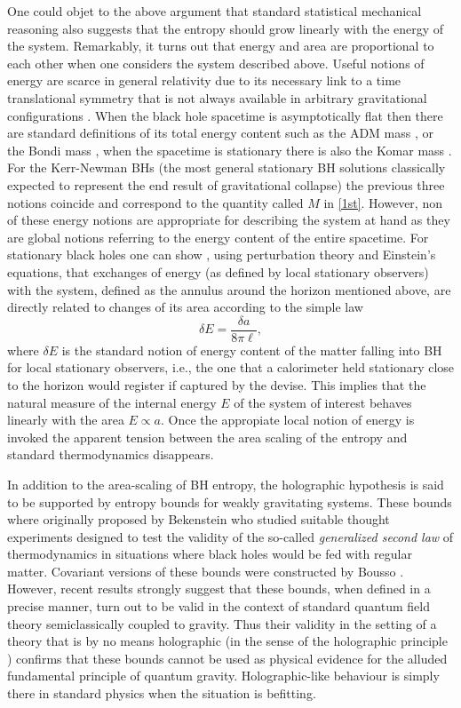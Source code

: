 \documentclass[aps, nofootinbib,superscriptaddress,12pt]{revtex4-2}
\def\be{\begin{equation}}
\def\ee{\end{equation}}
\begin{document}
One could objet to the above argument that standard statistical mechanical reasoning also suggests that the entropy should grow linearly with the energy of the system. Remarkably, it turns out that energy and area are proportional to each other when one considers the system described above. Useful notions of energy are scarce in general relativity due to its necessary link to a time translational symmetry that is not always available in arbitrary gravitational configurations \cite{Szabados:2009eka}. When the black hole spacetime is asymptotically flat then there are standard definitions of its total energy content such as the ADM mass \cite{Arnowitt:1959ah}, or the Bondi mass \cite{Bondi:1962px}, when the spacetime is stationary there is also the Komar mass \cite{Komar:1958wp}. For the Kerr-Newman BHs (the most general stationary BH solutions classically expected to represent the end result of gravitational collapse) the previous three notions coincide and correspond to the quantity called $M$ in \eqref{1st}. However, non of these energy notions are appropriate for describing the system at hand as they are global notions referring to the energy content of the entire spacetime.  For stationary black holes one can  show \cite{Frodden:2011eb}, using perturbation theory and Einstein's equations, that exchanges of energy (as defined by local stationary observers) with the system, defined as the 
annulus around the horizon mentioned above, are directly related to changes of its area according to the simple law
\be
\delta E=\frac{\delta a}{8\pi\ell},
\ee
where $\delta E$ is the standard notion of energy content of the matter falling into BH for local stationary observers, i.e., the one that a calorimeter held stationary close to the horizon would register if captured by the devise. This implies that the natural measure of the internal energy $E$ of the system of interest behaves linearly with the area $E\propto a$. Once the appropiate local notion of energy is invoked the apparent tension between the area scaling of the entropy and standard thermodynamics 
disappears. 

In addition to the area-scaling of BH entropy, the holographic hypothesis is said to be supported by entropy bounds
for weakly gravitating systems. These bounds where originally proposed by Bekenstein \cite{Bekenstein:1980jp} who studied suitable thought experiments designed to test the validity of the so-called {\em generalized second law} \cite{Bekenstein:1974ax} of thermodynamics in situations where black holes would be fed with regular matter.  Covariant versions of these bounds were constructed by Bousso \cite{Bousso:1999xy}. However, recent results \cite{Casini:2008cr, Bousso:2014sda} strongly suggest that these bounds, when defined 
in a precise manner, turn out to be valid in the context of standard quantum field theory semiclassically coupled to gravity. Thus their validity in the
setting of a theory that is by no means holographic (in the sense of the holographic principle \cite{Bousso:2002ju}) confirms that these bounds cannot be used as physical evidence for the alluded fundamental principle of quantum gravity.
Holographic-like behaviour is simply there in standard physics when the situation is befitting.  
\end{document}
